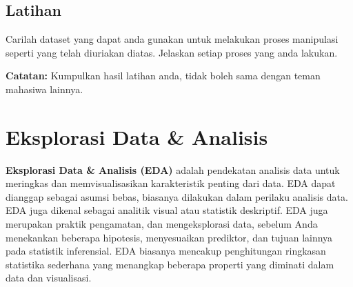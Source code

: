 \documentclass[
]{book}
\newenvironment{Shaded}{\begin{snugshade}}{\end{snugshade}}
\newcommand{\AttributeTok}[1]{\textcolor[rgb]{0.13,0.29,0.53}{#1}}
\newcommand{\CommentTok}[1]{\textcolor[rgb]{0.56,0.35,0.01}{\textit{#1}}}
\newcommand{\ConstantTok}[1]{\textcolor[rgb]{0.56,0.35,0.01}{#1}}
\newcommand{\DecValTok}[1]{\textcolor[rgb]{0.00,0.00,0.81}{#1}}
\newcommand{\FloatTok}[1]{\textcolor[rgb]{0.00,0.00,0.81}{#1}}
\newcommand{\FunctionTok}[1]{\textcolor[rgb]{0.13,0.29,0.53}{\textbf{#1}}}
\newcommand{\NormalTok}[1]{#1}
\newcommand{\OtherTok}[1]{\textcolor[rgb]{0.56,0.35,0.01}{#1}}
\newcommand{\SpecialCharTok}[1]{\textcolor[rgb]{0.81,0.36,0.00}{\textbf{#1}}}
\begin{document}
\begin{Shaded}
\end{Shaded}

\hypertarget{latihan-6}{%
\section{Latihan}\label{latihan-6}}

Carilah dataset yang dapat anda gunakan untuk melakukan proses manipulasi seperti yang telah diuriakan diatas. Jelaskan setiap proses yang anda lakukan.

\textbf{Catatan:} Kumpulkan hasil latihan anda, tidak boleh sama dengan teman mahasiwa lainnya.

\hypertarget{eksplorasi-data-analisis}{%
\chapter{Eksplorasi Data \& Analisis}\label{eksplorasi-data-analisis}}

\textbf{Eksplorasi Data \& Analisis (EDA)} adalah pendekatan analisis data untuk meringkas dan memvisualisasikan karakteristik penting dari data. EDA dapat dianggap sebagai asumsi bebas, biasanya dilakukan dalam perilaku analisis data. EDA juga dikenal sebagai analitik visual atau statistik deskriptif. EDA juga merupakan praktik pengamatan, dan mengeksplorasi data, sebelum Anda menekankan beberapa hipotesis, menyesuaikan prediktor, dan tujuan lainnya pada statistik inferensial. EDA biasanya mencakup penghitungan ringkasan statistika sederhana yang menangkap beberapa properti yang diminati dalam data dan visualisasi.
\end{document}

